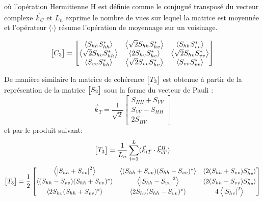  \vspace{10pt}
 
 où l’opération Hermitienne H est définie comme le conjugué transposé du vecteur complexe $\Vec{k}_{C}$ et $L_n$ exprime le nombre de vues sur lequel la matrice est moyennée et l’opérateur $\langle \cdot \rangle$ résume l’opération de moyennage sur un voisinage.  

\begin{equation}
\begin{bmatrix} C_3 \end{bmatrix} = \begin{bmatrix} 
\left\langle S_{hh} S_{hh}^* \right\rangle & \left\langle \sqrt{2} S_{hh} S_{hv}^* \right\rangle & \left\langle S_{hh} S_{vv}^* \right\rangle \\
 \left\langle \sqrt{2} S_{hv} S_{hh}^* \right\rangle & \left\langle 2 S_{hv} S_{hv}^* \right\rangle & \left\langle \sqrt{2} S_{hv} S_{vv}^* \right\rangle \\
 \left\langle S_{vv} S_{hh}^* \right\rangle & \left\langle \sqrt{2} S_{vv} S_{hv}^* \right\rangle & \left\langle S_{vv} S_{vv}^* \right\rangle
\end{bmatrix}
\end{equation}

\vspace{10pt}

 De manière similaire la matrice de cohérence  $\begin{bmatrix} T_3 \end{bmatrix}$ est obtenue à partir de la représention  de la matrice $\begin{bmatrix} S_2 \end{bmatrix}$ sous la forme  du vecteur de Pauli :
  \begin{equation}
 \Vec{k}_T =\frac{1}{\sqrt{2}} \begin{bmatrix} S_{HH}+S_{VV} \\ S_{VV}-S_{HH} \\  2S_{HV}\end{bmatrix}
 \end{equation}
et par le produit suivant:
  \begin{equation}
\begin{bmatrix} T_3 \end{bmatrix} = \frac{1}{L_n} \sum_{i=1}^{L}(\Vec{k}_{iT} \cdot \Vec{k}_{iT}^{H})
 \end{equation}
 \begin{equation}
\begin{bmatrix} T_3 \end{bmatrix} = \frac{1}{2} \begin{bmatrix} 
\left\langle  {|S_{hh} + S_{vv}|}^2 \right\rangle & \left\langle (S_{hh} + S_{vv})(S_{hh} - S_{vv})^* \right\rangle & \left\langle 2(S_{hh}+S_{vv})S_{hv}^* \right\rangle \\
\left\langle (S_{hh} - S_{vv})(S_{hh} + S_{vv})^* \right\rangle & \left\langle  {|S_{hh} - S_{vv}|}^2 \right\rangle & \left\langle 2(S_{hh}-S_{vv})S_{hv}^* \right\rangle \\
 \left\langle 2S_{hv}(S_{hh}+S_{vv})^* \right\rangle & \left\langle 2S_{hv}(S_{hh}-S_{vv})^* \right\rangle & 4\left\langle {|S_{hv}|}^2 \right\rangle
\end{bmatrix}
\end{equation}

